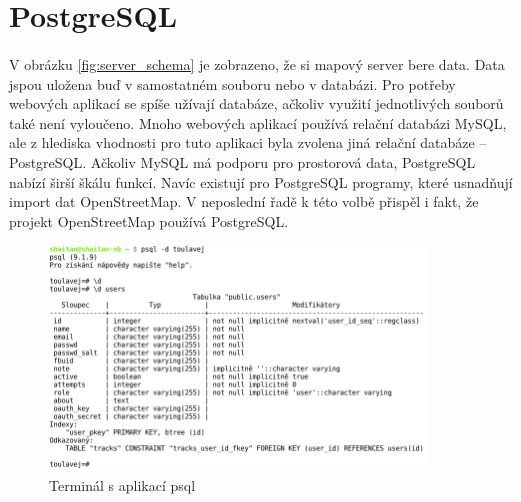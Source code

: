 \documentclass[11pt,a4paper,titlepage,oneside]{book}
\begin{document}
	\section{PostgreSQL}
		\paragraph{} V obrázku \ref{fig:server_schema} je zobrazeno, že si mapový server bere data. Data jspou uložena buď v samostatném souboru nebo v databázi. Pro potřeby webových aplikací se spíše užívají databáze, ačkoliv využití jednotlivých souborů také není vyloučeno. Mnoho webových aplikací používá relační databázi MySQL, ale z hlediska vhodnosti pro tuto aplikaci byla zvolena jiná relační databáze -- PostgreSQL. Ačkoliv MySQL má podporu pro prostorová data, PostgreSQL nabízí širší škálu funkcí. Navíc existují pro PostgreSQL programy, které usnadňují import dat OpenStreetMap. V neposlední řadě k této volbě přispěl i fakt, že projekt OpenStreetMap používá PostgreSQL.
		\begin{figure}[!h]
			\begin{center}
				\includegraphics[width=10cm]{obrazky/psql.png}
				\caption{Terminál s aplikací psql}
				\label{fig:psql}
			\end{center}
		\end{figure}
\end{document}
